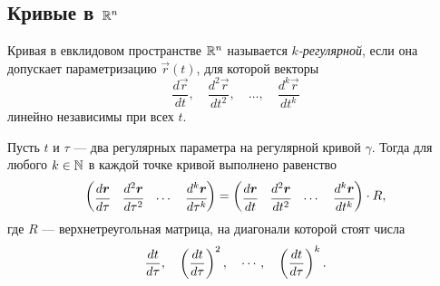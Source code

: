 %
%
%
%
%
%

\subsection{Кривые в $\R^n$}

\begin{definition}
	Кривая в евклидовом пространстве $\R^n$ называется \textit{$k$-регулярной}, если она допускает параметризацию $\vec{r}(t)$, для которой векторы
	\[
		\frac{d\vec{r}}{dt},\quad\frac{d^2\vec{r}}{dt^2},\quad\ldots,\quad \frac{d^k\vec{r}}{dt^k}
	\]
	линейно независимы при всех $t$.
\end{definition}

\begin{lemma} \label{lemma:UpperTriangleLemma}
	Пусть $t$ и $\tau$ --- два регулярных параметра на регулярной кривой $\gamma$. Тогда для любого $k \in \N$ в каждой точке кривой выполнено равенство
	\[
		\begin{pmatrix}
			\cfrac{d\vec{r}}{d\tau} & \cfrac{d^2\vec{r}}{d\tau^2} & \cdots & \cfrac{d^k\vec{r}}{d\tau^k}
		\end{pmatrix} =
		\begin{pmatrix}
			\cfrac{d\vec{r}}{dt} & \cfrac{d^2\vec{r}}{dt^2} & \cdots & \cfrac{d^k\vec{r}}{dt^k}
		\end{pmatrix} \cdot R,
	\]
	где $R$ --- верхнетреугольная матрица, на диагонали которой стоят числа
	\[
		\frac{dt}{d\tau},\quad\br{\frac{dt}{d\tau}}^2,\quad\cdots,\quad\br{\frac{dt}{d\tau}}^k.
	\]
\end{lemma}

